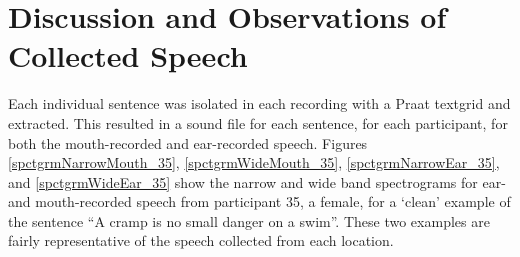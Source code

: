 



\section{Discussion and Observations of Collected Speech}\DIFaddend \label{chap2:observations}

Each individual sentence was isolated in each recording with a Praat textgrid and extracted.  This resulted in a sound file for each sentence, for each participant, for both the mouth-recorded and ear-recorded speech.  Figures \ref{spctgrmNarrowMouth_35}, \ref{spctgrmWideMouth_35}, \ref{spctgrmNarrowEar_35}, and \ref{spctgrmWideEar_35} show the narrow and wide band spectrograms for ear- and mouth-recorded speech from participant 35, a female, for a `clean' example of the sentence ``A cramp is no small danger on a swim''.  These two examples are fairly representative of the speech collected from each location.

